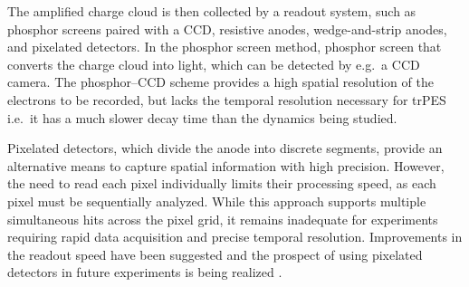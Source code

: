 The amplified charge cloud is then collected by a readout system, such as  phosphor screens paired with a \gls{CCD}, resistive anodes, wedge-and-strip anodes, and pixelated detectors. In the phosphor screen method, phosphor screen that converts the charge cloud into light, which can be detected by e.g.\ a \gls{CCD} camera. The phosphor--\gls{CCD} scheme provides a high spatial resolution of the electrons to be recorded, but lacks the temporal resolution necessary for \gls{trPES} i.e.\ it has a much slower decay time than the dynamics being studied.

Pixelated detectors, which divide the anode into discrete segments, provide an alternative means to capture spatial information with high precision. However, the need to read each pixel individually limits their processing speed, as each pixel must be sequentially analyzed. While this approach supports multiple simultaneous hits across the pixel grid, it remains inadequate for experiments requiring rapid data acquisition and precise temporal resolution. Improvements in the readout speed have been suggested and the prospect of using pixelated detectors in future experiments is being realized \cite{correaTEMPUSTimepix4basedSystem2024}.

